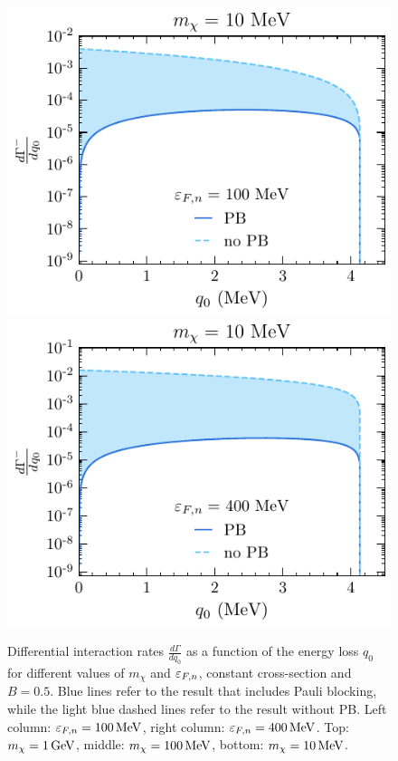 \begin{figure}[t!bp]
    \includegraphics[width=.48\textwidth]{capture_1/diff_intrate_n0_mu_100MeV_mdm10MeV.pdf}
    \includegraphics[width=.48\textwidth]{capture_1/diff_intrate_n0_mu_400MeV_mdm10MeV.pdf}
    \caption[Differential interaction rates $\frac{d\Gamma}{dq_0}$  
    as a function of the energy loss $q_0$ for different values of $m_\chi$ and $\kinFn$, constant cross-section and $B=0.5$.]{Differential interaction rates $\frac{d\Gamma}{dq_0}$  
    as a function of the energy loss $q_0$ for different values of $m_\chi$ and $\kinFn$, constant cross-section and $B=0.5$. Blue lines refer to the result that includes Pauli blocking, while the light blue dashed lines refer to the result without PB. Left column:  $\varepsilon_{F,n}=100{\rm \,MeV}$, right column: $\varepsilon_{F,n}=400{\rm \,MeV}$. Top: $m_\chi=1{\rm \,GeV}$, middle: $m_\chi=100{\rm \,MeV}$, bottom: $m_\chi=10{\rm \,MeV}$.}
    \label{ch3:fig:gammaNPBmu}
\end{figure}




